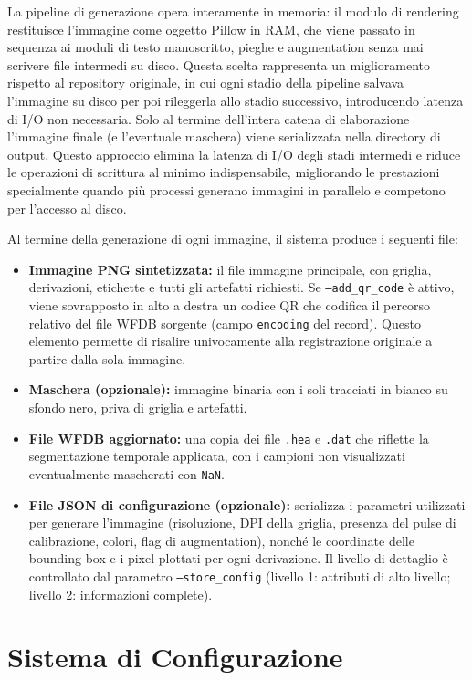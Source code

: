 La pipeline di generazione opera interamente in memoria: il modulo di rendering restituisce l'immagine come oggetto Pillow in RAM, che viene passato in sequenza ai moduli di testo manoscritto, pieghe e augmentation senza mai scrivere file intermedi su disco. Questa scelta rappresenta un miglioramento rispetto al repository originale, in cui ogni stadio della pipeline salvava l'immagine su disco per poi rileggerla allo stadio successivo, introducendo latenza di I/O non necessaria. Solo al termine dell'intera catena di elaborazione l'immagine finale (e l'eventuale maschera) viene serializzata nella directory di output. Questo approccio elimina la latenza di I/O degli stadi intermedi e riduce le operazioni di scrittura al minimo indispensabile, migliorando le prestazioni specialmente quando più processi generano immagini in parallelo e competono per l'accesso al disco.

Al termine della generazione di ogni immagine, il sistema produce i seguenti file:

\begin{itemize}
    \item \textbf{Immagine PNG sintetizzata:} il file immagine principale, con griglia, derivazioni, etichette e tutti gli artefatti richiesti. Se \texttt{--add\_qr\_code} è attivo, viene sovrapposto in alto a destra un codice QR che codifica il percorso relativo del file WFDB sorgente (campo \texttt{encoding} del record). Questo elemento permette di risalire univocamente alla registrazione originale a partire dalla sola immagine.
    \item \textbf{Maschera (opzionale):} immagine binaria con i soli tracciati in bianco su sfondo nero, priva di griglia e artefatti.
    \item \textbf{File WFDB aggiornato:} una copia dei file \texttt{.hea} e \texttt{.dat} che riflette la segmentazione temporale applicata, con i campioni non visualizzati eventualmente mascherati con \texttt{NaN}.
    \item \textbf{File JSON di configurazione (opzionale):} serializza i parametri utilizzati per generare l'immagine (risoluzione, DPI della griglia, presenza del pulse di calibrazione, colori, flag di augmentation), nonché le coordinate delle bounding box e i pixel plottati per ogni derivazione. Il livello di dettaglio è controllato dal parametro \texttt{--store\_config} (livello 1: attributi di alto livello; livello 2: informazioni complete).
\end{itemize}

\section{Sistema di Configurazione}

